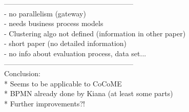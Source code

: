 ------------------------------------------------------\\
- no parallelism (gateway) \\
- needs business process models\\
- Clustering algo not defined (information in other paper)\\
- short paper (no detailed information)\\
- no info about evaluation process, data set...\\




------------------------------------------------------\\
Conclusion: \\
* Seems to be applicable to CoCoME\\
* BPMN already done by Kiana (at least some parts)\\
* Further improvements?!\\











